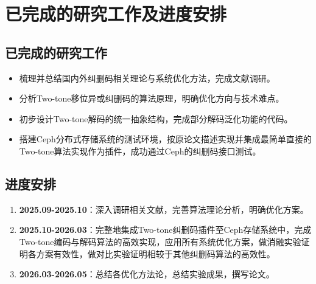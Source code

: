 
\chapter{已完成的研究工作及进度安排}

\section{已完成的研究工作}

\begin{itemize}
    \item 梳理并总结国内外纠删码相关理论与系统优化方法，完成文献调研。
    \item 分析Two-tone移位异或纠删码的算法原理，明确优化方向与技术难点。
    \item 初步设计Two-tone解码的统一抽象结构，完成部分解码泛化功能的代码。
    \item 搭建Ceph分布式存储系统的测试环境，按原论文描述实现并集成最简单直接的Two-tone算法实现作为插件，成功通过Ceph的纠删码接口测试。
\end{itemize}

\section{进度安排}

\begin{enumerate}
    \item \textbf{2025.09-2025.10}：深入调研相关文献，完善算法理论分析，明确优化方案。
    \item \textbf{2025.10-2026.03}：完整地集成Two-tone纠删码插件至Ceph存储系统中，完成Two-tone编码与解码算法的高效实现，应用所有系统优化方案，做消融实验证明各方案有效性，做对比实验证明相较于其他纠删码算法的高效性。
    \item \textbf{2026.03-2026.05}：总结各优化方法论，总结实验成果，撰写论文。
\end{enumerate}